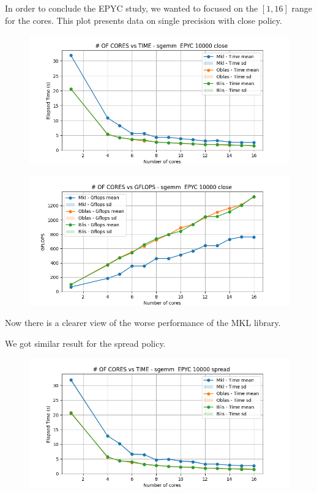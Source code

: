 \documentclass{article}
\begin{document}
In order to conclude the EPYC study, we wanted to focused on the $[1,16]$ range for the cores.
This plot presents data on single precision with close policy.
\begin{figure}[H]
    \centering
    \includegraphics[width=\textwidth]{EPYC scalability deep/sgemm__EPYC_10000_close_time.png}
\end{figure}

\begin{figure}[H]
    \centering
    \includegraphics[width=\textwidth]{EPYC scalability deep/sgemm__EPYC_10000_close_gflops.png}
\end{figure}
Now there is a clearer view of the worse performance of the MKL library. 

We got similar result for the spread policy.
\begin{figure}[H]
    \centering
    \includegraphics[width=\textwidth]{EPYC scalability deep/sgemm__EPYC_10000_spread_time.png}
\end{figure}
\end{document}
